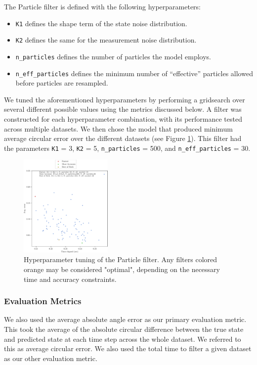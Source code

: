 \documentclass[11pt]{amsart}
\begin{document}
The Particle filter is defined with the following hyperparameters: 
\begin{itemize}
    \item \lstinline{K1} defines the shape term of the state noise distribution.
    \item \lstinline{K2} defines the same for the measurement noise distribution.
    \item \lstinline{n_particles} defines the number of particles the model employs.
    \item \lstinline{n_eff_particles} defines the minimum number of “effective” particles allowed before particles are resampled.
\end{itemize}

We tuned the aforementioned hyperparameters by performing a
gridsearch over several different possible values using the metrics discussed below. A filter was constructed for each hyperparameter
combination, with its performance tested across multiple datasets. We then chose the
model that produced minimum average circular error over the different datasets (see Figure \ref{fig:particle_hyperparam}). This filter had the parameters \lstinline{K1} = 3, \lstinline{K2} = 5, \lstinline{n_particles} = 500, and \lstinline{n_eff_particles} = 30.

\begin{figure}[htp]
    \centering
    \includegraphics[width=0.4\textwidth]{actual_paper_graphs/gridsearch_particle_filter.pdf}\hfill
    \caption{Hyperparameter tuning of the Particle filter. Any filters colored orange may be considered "optimal", depending on the necessary time and accuracy constraints.}
    \label{fig:particle_hyperparam}
\end{figure}

\subsubsection{Evaluation Metrics}
We also used the average absolute angle error as our primary evaluation metric. This took the average of the absolute circular difference between the true state and predicted state at each time step across the whole dataset. We referred to this as average circular error. We also used the total time to filter a given dataset as our other evaluation metric.
\end{document}
